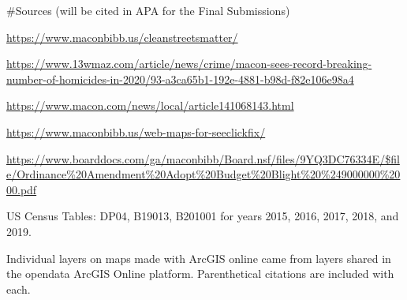 \documentclass[
]{article}
\begin{document}
\#Sources (will be cited in APA for the Final Submissions)

\url{https://www.maconbibb.us/cleanstreetsmatter/}

\url{https://www.13wmaz.com/article/news/crime/macon-sees-record-breaking-number-of-homicides-in-2020/93-a3ca65b1-192e-4881-b98d-f82e106e98a4}

\url{https://www.macon.com/news/local/article141068143.html}

\url{https://www.maconbibb.us/web-maps-for-seeclickfix/}

\url{https://www.boarddocs.com/ga/maconbibb/Board.nsf/files/9YQ3DC76334E/$file/Ordinance\%20Amendment\%20Adopt\%20Budget\%20Blight\%20\%249000000\%2000.pdf}

US Census Tables: DP04, B19013, B201001 for years 2015, 2016, 2017,
2018, and 2019.

Individual layers on maps made with ArcGIS online came from layers
shared in the opendata ArcGIS Online platform. Parenthetical citations
are included with each.
\end{document}
